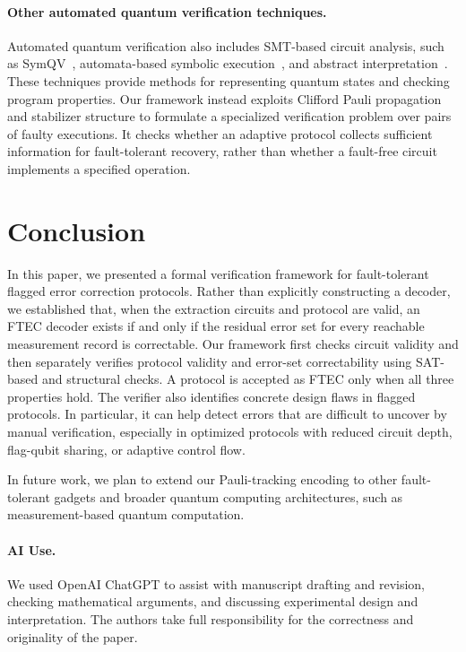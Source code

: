 \documentclass[acmsmall,screen,review,anonymous,nonacm]{acmart}
\begin{document}
\paragraph{Other automated quantum verification techniques.}
Automated quantum verification also includes SMT-based circuit analysis, such as SymQV~\cite{BauerMarquartLS23}, automata-based symbolic execution~\cite{ChenCLLTY23,ChenCLLT23,autoq2}, and abstract interpretation~\cite{yu2021quantum,perdrix2008quantum}. These techniques provide methods for representing quantum states and checking program properties. Our framework instead exploits Clifford Pauli propagation and stabilizer structure to formulate a specialized verification problem over pairs of faulty executions. It checks whether an adaptive protocol collects sufficient information for fault-tolerant recovery, rather than whether a fault-free circuit implements a specified operation.



\section{Conclusion}

In this paper, we presented a formal verification framework for fault-tolerant flagged error correction protocols. 
Rather than explicitly constructing a decoder, we established that, when the extraction circuits and protocol are valid, an FTEC decoder exists if and only if the residual error set for every reachable measurement record is correctable.
Our framework first checks circuit validity and then separately verifies protocol validity and error-set correctability using SAT-based and structural checks. A protocol is accepted as FTEC only when all three properties hold. The verifier also identifies concrete design flaws in flagged protocols.
In particular, it can help detect errors that are difficult to uncover by
manual verification, especially in optimized protocols with reduced circuit
depth, flag-qubit sharing, or adaptive control flow.

In future work, we plan to extend our Pauli-tracking encoding to other
fault-tolerant gadgets and broader quantum computing architectures, such as
measurement-based quantum computation.

\paragraph{AI Use.}
We used OpenAI ChatGPT to assist with manuscript drafting and
revision, checking mathematical arguments, and discussing
experimental design and interpretation.
The authors take full responsibility for the correctness
and originality of the paper.
\end{document}
